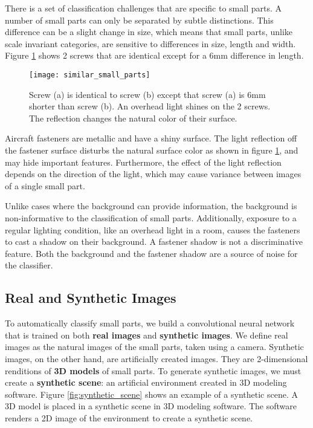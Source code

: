 There is a set of classification challenges that are specific to small parts. A number of small parts can only be separated by subtle distinctions. This difference can be a slight change in size, which means that small parts, unlike scale invariant categories, are sensitive to differences in size, length and width. Figure \ref{fig:similar_small_parts} shows 2 screws that are identical except for a 6mm difference in length.

\begin{figure}[h]
\centering
  \texttt{[image: similar\_small\_parts]}
\caption{Screw (a) is identical to screw (b) except that screw (a) is 6mm shorter than screw (b). An overhead light shines on the 2 screws. The reflection changes the natural color of their surface.}
\label{fig:similar_small_parts}
\end{figure}

Aircraft fasteners are metallic and have a shiny surface. The light reflection off the fastener surface disturbs the natural surface color as shown in figure \ref{fig:similar_small_parts}, and may hide important features. Furthermore, the effect of the light reflection depends on the direction of the light, which may cause variance between images of a single small part.

Unlike cases where the background can provide information, the background is non-informative to the classification of small parts. Additionally, exposure to a regular lighting condition, like an overhead light in a room, causes the fasteners to cast a shadow on their background. A fastener shadow is not a discriminative feature. Both the background and the fastener shadow are a source of noise for the classifier.

\subsection{Real and Synthetic Images}
To automatically classify small parts, we build a convolutional neural network that is trained on both \textbf{real images} and \textbf{synthetic images}. We define real images as the natural images of the small parts, taken using a camera. Synthetic images, on the other hand, are artificially created images. They are 2-dimensional renditions of \textbf{3D models} of small parts. To generate synthetic images, we must create a \textbf{synthetic scene}: an artificial environment created in 3D modeling software. Figure \ref{fig:synthetic_scene} shows an example of a synthetic scene. A 3D model is placed in a synthetic scene in 3D modeling software. The software renders a 2D image of the environment to create a synthetic scene.

